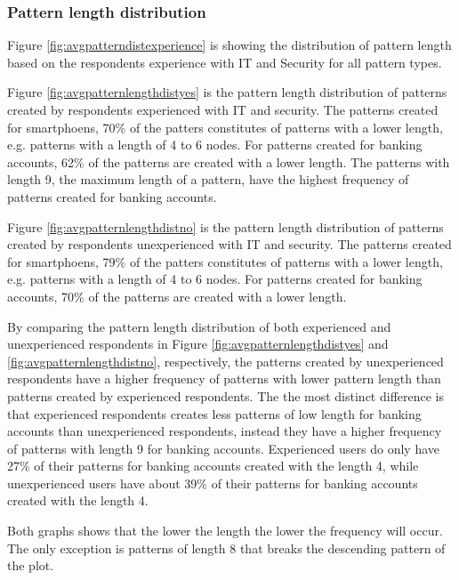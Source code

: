     \subsubsection{Pattern length distribution}

      Figure \ref{fig:avgpatterndistexperience} is showing the distribution of pattern length based on the respondents experience with IT and Security for all pattern types. 

      Figure \ref{fig:avgpatternlengthdistyes} is the pattern length distribution of patterns created by respondents experienced with IT and security. The patterns created for smartphoens, 70\% of the patters constitutes of patterns with a lower length, e.g. patterns with a length of 4 to 6 nodes. For patterns created for banking accounts, 62\% of the patterns are created with a lower length. The patterns with length 9, the maximum length of a pattern, have the highest frequency of patterns created for banking accounts. 

      Figure \ref{fig:avgpatternlengthdistno} is the pattern length distribution of patterns created by respondents unexperienced with IT and security. The patterns created for smartphoens, 79\% of the patters constitutes of patterns with a lower length, e.g. patterns with a length of 4 to 6 nodes. For patterns created for banking accounts, 70\% of the patterns are created with a lower length.

      By comparing the pattern length distribution of both experienced and unexperienced respondents in Figure \ref{fig:avgpatternlengthdistyes} and \ref{fig:avgpatternlengthdistno}, respectively, the patterns created by unexperienced respondents have a higher frequency of patterns with lower pattern length than patterns created by experienced respondents. The the most distinct difference is that experienced respondents creates less patterns of low length for banking accounts than unexperienced respondents, instead they have a higher frequency of patterns with length 9 for banking accounts. Experienced users do only have 27\% of their patterns for banking accounts created with the length 4, while unexperienced users have about 39\% of their patterns for banking accounts created with the length 4. 

      Both graphs shows that the lower the length the lower the frequency will occur. The only exception is patterns of length 8 that breaks the descending pattern of the plot. 

